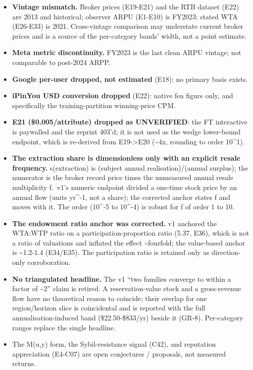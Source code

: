 \documentclass[
  11pt,
]{article}
\begin{document}
\begin{itemize}
  aggregation value. Both remain non-identified as points; the rent gap
  moves with region, tenure, and denominator choice (stress range
  \textasciitilde1x10\^{}4 to \textasciitilde2x10\^{}6).
\item
  \textbf{Vintage mismatch.} Broker prices (E19-E21) and the RTB dataset
  (E22) are 2013 and historical; observer ARPU (E1-E10) is FY2023;
  stated WTA (E26-E33) is 2021. Cross-vintage comparison may understate
  current broker prices and is a source of the per-category bands'
  width, not a point estimate.
\item
  \textbf{Meta metric discontinuity.} FY2023 is the last clean ARPU
  vintage; not comparable to post-2024 ARPP.
\item
  \textbf{Google per-user dropped, not estimated} (E18): no primary
  basis exists.
\item
  \textbf{iPinYou USD conversion dropped} (E22): native fen figure only,
  and specifically the training-partition winning-price CPM.
\item
  \textbf{E21 (\$0.005/attribute) dropped as UNVERIFIED}: the FT
  interactive is paywalled and the reprint 403'd; it is not used as the
  wedge lower-bound endpoint, which is re-derived from
  E19-\textgreater E20 (\textasciitilde4x, rounding to order 10\^{}1).
\item
  \textbf{The extraction share is dimensionless only with an explicit
  resale frequency.} s(extraction) is (subject annual
  realisation)/(annual surplus); the numerator is the broker record
  price times the unmeasured annual resale multiplicity f.~v1's numeric
  endpoint divided a one-time stock price by an annual flow (units
  yr\^{}-1, not a share); the corrected anchor states f and moves with
  it. The order (10\^{}-5 to 10\^{}-4) is robust for f of order 1 to 10.
\item
  \textbf{The endowment ratio anchor was corrected.} v1 anchored the
  WTA:WTP ratio on a participation-proportion ratio (5.37, E36), which
  is not a ratio of valuations and inflated the effect
  \textasciitilde fourfold; the value-based anchor is
  \textasciitilde1.2-1.4 (E34/E35). The participation ratio is retained
  only as direction-only corroboration.
\item
  \textbf{No triangulated headline.} The v1 ``two families converge to
  within a factor of \textasciitilde2'' claim is retired. A
  reservation-value stock and a gross-revenue flow have no theoretical
  reason to coincide; their overlap for one region/horizon slice is
  coincidental and is reported with the full annualisation-induced band
  (\$22.50-\$833/yr) beside it (GR-8). Per-category ranges replace the
  single headline.
\item
  The M(u,y) form, the Sybil-resistance signal (C42), and reputation
  appreciation (E4-C07) are open conjectures / proposals, not measured
  returns.
\end{itemize}
\end{document}
